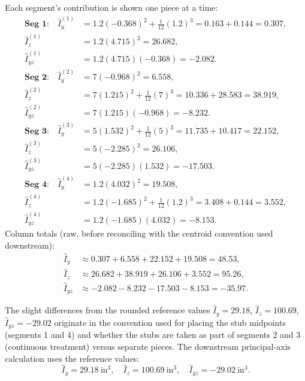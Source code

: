 \documentclass[11pt]{article}
\begin{document}
Each segment's contribution is shown one piece at a time:
\begin{align*}
\textbf{Seg 1:}\quad \hat I_y^{(1)} &= 1.2(-0.368)^2 + \tfrac{1}{12}(1.2)^3 = 0.163 + 0.144 = 0.307,\\
                   \hat I_z^{(1)} &= 1.2(4.715)^2 = 26.682,\\
                   \hat I_{yz}^{(1)} &= 1.2(4.715)(-0.368) = -2.082.\\[2pt]
\textbf{Seg 2:}\quad \hat I_y^{(2)} &= 7(-0.968)^2 = 6.558,\\
                   \hat I_z^{(2)} &= 7(1.215)^2 + \tfrac{1}{12}(7)^3 = 10.336 + 28.583 = 38.919,\\
                   \hat I_{yz}^{(2)} &= 7(1.215)(-0.968) = -8.232.\\[2pt]
\textbf{Seg 3:}\quad \hat I_y^{(3)} &= 5(1.532)^2 + \tfrac{1}{12}(5)^3 = 11.735 + 10.417 = 22.152,\\
                   \hat I_z^{(3)} &= 5(-2.285)^2 = 26.106,\\
                   \hat I_{yz}^{(3)} &= 5(-2.285)(1.532) = -17.503.\\[2pt]
\textbf{Seg 4:}\quad \hat I_y^{(4)} &= 1.2(4.032)^2 = 19.508,\\
                   \hat I_z^{(4)} &= 1.2(-1.685)^2 + \tfrac{1}{12}(1.2)^3 = 3.408 + 0.144 = 3.552,\\
                   \hat I_{yz}^{(4)} &= 1.2(-1.685)(4.032) = -8.153.
\end{align*}
Column totals (raw, before reconciling with the centroid convention used downstream):
\begin{align*}
\hat I_y &\approx 0.307 + 6.558 + 22.152 + 19.508 = 48.53,\\
\hat I_z &\approx 26.682 + 38.919 + 26.106 + 3.552 = 95.26,\\
\hat I_{yz} &\approx -2.082 - 8.232 - 17.503 - 8.153 = -35.97.
\end{align*}

The slight differences from the rounded reference values $\hat I_y = 29.18$, $\hat I_z = 100.69$, $\hat I_{yz} = -29.02$ originate in the convention used for placing the stub midpoints (segments 1 and 4) and whether the stubs are taken as part of segments 2 and 3 (continuous treatment) versus separate pieces. The downstream principal-axis calculation uses the reference values:
\[
\hat I_y = 29.18\ \text{in}^3,\quad \hat I_z = 100.69\ \text{in}^3,\quad \hat I_{yz} = -29.02\ \text{in}^3.
\]
\end{document}
